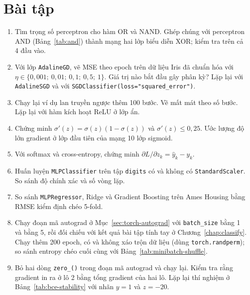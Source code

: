 \section{Bài tập}
\begin{enumerate}
    \item Tìm trọng số perceptron cho hàm OR và NAND. Ghép chúng với perceptron AND (Bảng~\ref{tab:and}) thành mạng hai lớp biểu diễn XOR; kiểm tra trên cả 4 đầu vào.
    \item Với lớp \texttt{AdalineGD}, vẽ MSE theo epoch trên dữ liệu Iris đã chuẩn hóa với $\eta \in \{0{,}001;\ 0{,}01;\ 0{,}1;\ 0{,}5;\ 1\}$. Giá trị nào bắt đầu gây phân kỳ? Lặp lại với \texttt{AdalineSGD} và với \texttt{SGDClassifier(loss="squared\_error")}.
    \item Chạy lại ví dụ lan truyền ngược thêm 100 bước. Vẽ mất mát theo số bước. Lặp lại với hàm kích hoạt ReLU ở lớp ẩn.
    \item Chứng minh $\sigma'(z) = \sigma(z)(1 - \sigma(z))$ và $\sigma'(z) \leq 0{,}25$. Ước lượng độ lớn gradient ở lớp đầu tiên của mạng 10 lớp sigmoid.
    \item Với softmax và cross-entropy, chứng minh $\partial L / \partial z_k = \hat{y}_k - y_k$.
    \item Huấn luyện \texttt{MLPClassifier} trên tập \texttt{digits} có và không có \texttt{StandardScaler}. So sánh độ chính xác và số vòng lặp.
    \item So sánh \texttt{MLPRegressor}, Ridge và Gradient Boosting trên Ames Housing bằng RMSE kiểm định chéo 5-fold.
    \item Chạy đoạn mã autograd ở Mục~\ref{sec:torch-autograd} với \texttt{batch\_size} bằng 1 và bằng 5, rồi đối chiếu với kết quả bài tập tính tay ở Chương~\ref{chap:classify}. Chạy thêm 200 epoch, có và không xáo trộn dữ liệu (dùng \texttt{torch.randperm}); so sánh entropy chéo cuối cùng với Bảng~\ref{tab:minibatch-shuffle}.
    \item Bỏ hai dòng \texttt{zero\_()} trong đoạn mã autograd và chạy lại. Kiểm tra rằng gradient in ra ở lô 2 bằng tổng gradient của hai lô. Lặp lại thí nghiệm ở Bảng~\ref{tab:bce-stability} với nhãn $y = 1$ và $z = -20$.
\end{enumerate}

